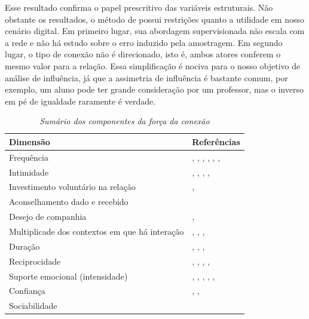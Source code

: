 \documentclass{article}
\begin{document}
Esse resultado confirma o papel prescritivo das variáveis estruturais. Não
obstante os resultados, o método de \cite{Gilbert2009} possui restrições quanto a
utilidade em nosso cenário digital. Em primeiro lugar, sua abordagem
supervisionada não escala com a rede e não há estudo sobre o erro induzido pela
amostragem. Em segundo lugar, o tipo de conexão não é direcionado, isto é, ambos
atores conferem o mesmo valor para a relação. Essa simplificação é nociva para o
nosso objetivo de análise de influência, já que a assimetria de influência é
bastante comum, por exemplo, um aluno pode ter grande consideração por um
professor, mas o inverso em pé de igualdade raramente é verdade.

\begin{table} [htbp]
	\large       %
	\setlength{\arrayrulewidth}{2\arrayrulewidth}  %
	\setlength{\belowcaptionskip}{10pt}  %
	\caption{\textit{Sumário dos componentes da força da conexão}
	\cite{Petroczi2006}} \centering   %
	\begin{tabular}{| p{5cm} | p{4cm} |}
	\hline
	\textbf{Dimensão} & \textbf{Referências} \\ \hline\hline
	Frequência & \cite{Benassi1999}, \cite{Blumstein1988}, 
	\cite{Granovetter1995}, \cite{Marsden1984}, \cite{MATHEWS1998},
	\cite{Mitchell1987}, \cite{Perlman1987} \\\hline
	Intimidade & \cite{Blumstein1988}, \cite{Marsden1984}, \cite{MATHEWS1998},
	\cite{Mitchell1987}, \cite{Perlman1987}\\\hline
	Investimento voluntário na relação & \cite{Blumstein1988},
	\cite{Perlman1987}\\\hline
	Aconselhamento dado e recebido & \cite{MATHEWS1998}\\\hline
	Desejo de companhia & \cite{Blumstein1988}, \cite{Perlman1987}\\\hline
	Multiplicade dos contextos em que há interação & \cite{Blumstein1988},
	\cite{Granovetter1973}, \cite{Marsden1984}, \cite{Perlman1987}\\\hline
	Duração & \cite{Blumstein1988}, \cite{Granovetter1973}, \cite{Marsden1984},
	\cite{Perlman1987}\\\hline
	Reciprocidade & \cite{Blumstein1988}, \cite{Friedkin1980},
	\cite{Granovetter1973}, \cite{MATHEWS1998}, \cite{Perlman1987}\\\hline
	Suporte	emocional (intensidade) & \cite{Blumstein1988},
	\cite{Granovetter1973}, \cite{Mitchell1987}, \cite{Perlman1987},
	\cite{Wellman1982}, \cite{Wellman1990}\\\hline
	Confiança & \cite{Granovetter1973}, \cite{Marsden1984},
	\cite{MATHEWS1998}\\\hline
	Sociabilidade & \cite{Mitchell1987}\\
	\hline
	\end{tabular}
	\label{tab:resumao}
\end{table}
\end{document}
